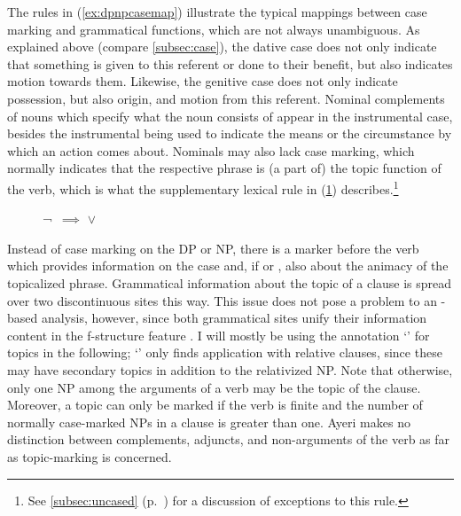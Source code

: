 The rules in (\ref{ex:dpnpcasemap}) illustrate the typical mappings between
case marking and grammatical functions, which are not always
unambiguous. As explained above (compare
\autoref{subsec:case}), the dative case does not only
indicate that something is given to this referent or done to their benefit, but
also indicates motion towards them. Likewise, the genitive
case does not only indicate possession, but also origin, and motion from this referent. Nominal
complements of nouns which specify
what the noun consists of appear in the instrumental
case, besides the instrumental
being used to indicate the means or the circumstance by which an action comes
about. Nominals may also lack case marking, which normally indicates
that the respective phrase is (a part of) the topic function of the verb, which is what the
supplementary lexical rule in (\ref{ex:topicrule}) describes.\footnote{See
\autoref{subsec:uncased} (p.~\pageref{subsec:uncased}) for a discussion of
exceptions to this rule.}

\begin{figure}
\ex\label{ex:topicrule}
¬\,\downs{\Case} $\implies$ \pass{\Top} $\vee$ \elem{\Top}
\xe
\end{figure}

Instead of case marking on the DP or NP, there is a marker before the verb
which provides information on the case and, if \AgtT{} or \PatT{},
also about the animacy of the topicalized phrase. Grammatical information about the
topic of a clause is spread over two
discontinuous sites this way. This issue does not pose a problem to an
\Lfg{}-based analysis, however, since both
grammatical sites unify their information content in the f-structure feature
\Top{}. I will mostly be using the annotation `\pass{\Top}' for
topics in the following; `\elem{\Top}' only
finds application with relative clauses, since these may
have secondary topics in addition to the
relativized NP. Note that otherwise, only one NP among the arguments of a verb
may be the topic of the clause. Moreover, a
topic can only be marked if the
verb is finite and the number of normally case-marked
NPs in a clause is greater than one. Ayeri makes no distinction between
complements, adjuncts, and non-arguments of the verb as far as topic-marking is
concerned.

